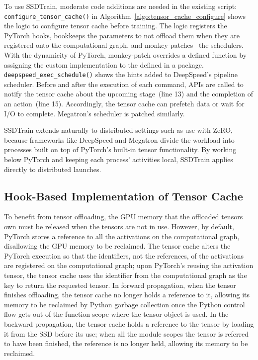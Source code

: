 To use SSDTrain, moderate code additions are needed in the existing script: \texttt{configure\_tensor\_cache()} in Algorithm~\ref{algo:tensor_cache_configure} shows the logic to configure tensor cache before training. The logic registers the PyTorch hooks, bookkeeps the parameters to not offload them when they are registered onto the computational graph, and monkey-patches~\cite{wikipediaMonkeyPatch2024} the schedulers. 
With the dynamicity of PyTorch, monkey-patch overrides a defined function by assigning the custom implementation to the defined  in a package. \texttt{deepspeed\_exec\_schedule()} shows the hints added to DeepSpeed's pipeline scheduler. Before and after the execution of each command, APIs are called to notify the tensor cache about the upcoming stage~(line 13) and the completion of an action~(line 15). Accordingly, the tensor cache can prefetch data or wait for I/O to complete. Megatron's scheduler is patched similarly.
 
SSDTrain extends naturally to distributed settings such as use with ZeRO, because frameworks like DeepSpeed and Megatron divide the workload into processes built on top of PyTorch's built-in tensor functionality.
By working below PyTorch and keeping each process' activities local, SSDTrain applies directly to distributed launches.





\subsection{Hook-Based Implementation of Tensor Cache}
\label{sec:tensor_cache}

To benefit from tensor offloading, the GPU memory that the offloaded tensors own must be released when the tensors are not in use. However, by default, PyTorch stores a reference to all the activations on the computational graph, disallowing the GPU memory to be reclaimed. The tensor cache alters the PyTorch execution so that the identifiers, not the references, of the activations are registered on the computational graph; upon PyTorch's reusing the activation tensor, the tensor cache uses the identifier from the computational graph as the key to return the requested tensor. In forward propagation, when the tensor finishes offloading, the tensor cache no longer holds a reference to it, allowing its memory to be reclaimed by Python garbage collection once the Python control flow gets out of the function scope where the tensor object is used. In the backward propagation, the tensor cache holds a reference to the tensor by loading it from the SSD before its use; when all the module scopes the tensor is referred to have been finished, the reference is no longer held, allowing its memory to be reclaimed.



